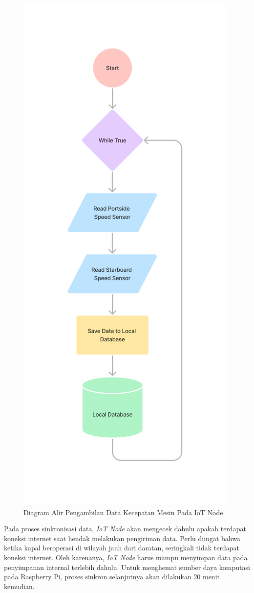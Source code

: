 
\begin{figure}[!h]
    \includegraphics[width=.6\linewidth, center]{images/flowcharts/flow-iot-nodes.png}
    \caption{Diagram Alir Pengambilan Data Kecepatan Mesin Pada IoT Node}
    \label{fig:flow-iot-node}
\end{figure}

\newpage

Pada proses sinkronisasi data, \textit{IoT Node} akan mengecek dahulu apakah terdapat koneksi internet saat hendak melakukan pengiriman data. Perlu diingat bahwa ketika kapal beroperasi di wilayah jauh dari daratan, seringkali tidak terdapat koneksi internet. Oleh karenanya, \textit{IoT Node} harus mampu menyimpan data pada penyimpanan internal terlebih dahulu. Untuk menghemat sumber daya komputasi pada Raspberry Pi, proses sinkron selanjutnya akan dilakukan 20 menit kemudian.

